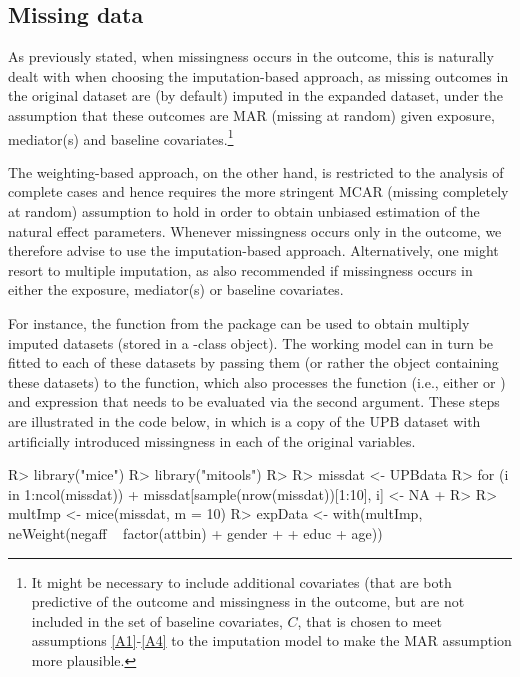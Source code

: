 \documentclass[nojss]{jss}
\begin{document}
\subsection{Missing data}
As previously stated, when missingness occurs in the outcome, this is naturally dealt with when choosing the imputation-based approach, as missing outcomes in the original dataset are (by default) imputed in the expanded dataset, under the assumption that these outcomes are MAR (missing at random) given exposure, mediator(s) and baseline covariates.\footnote{It might be necessary to include additional covariates (that are both predictive of the outcome and missingness in the outcome, but are not included in the set of baseline covariates, $C$, that is chosen to meet assumptions \ref{A1}-\ref{A4} to the imputation model to make the MAR assumption more plausible.} 
\par The weighting-based approach, on the other hand, is restricted to the analysis of complete cases and hence requires the more stringent MCAR (missing completely at random) assumption to hold in order to obtain unbiased estimation of the natural effect parameters. Whenever missingness occurs only in the outcome, we therefore advise to use the imputation-based approach. Alternatively, one might resort to multiple imputation, as also recommended if missingness occurs in either the exposure, mediator(s) or baseline covariates. 
\par For instance, the  function from the  package \citep{R:mice} can be used to obtain multiply imputed datasets (stored in a -class object). The working model can in turn be fitted to each of these datasets by passing them (or rather the object containing these datasets) to the  function, which also processes the function (i.e., either  or ) and expression that needs to be evaluated via the second argument. These steps are illustrated in the code below, in which  is a copy of the UPB dataset with artificially introduced missingness in each of the original variables.
\begin{Schunk}
\begin{Sinput}
R> library("mice")
R> library("mitools")
R> 
R> missdat <- UPBdata
R> for (i in 1:ncol(missdat)) {
+    missdat[sample(nrow(missdat))[1:10], i] <- NA
+  }
R> 
R> multImp <- mice(missdat, m = 10)
R> expData <- with(multImp, neWeight(negaff ~ factor(attbin) + gender 
+    + educ + age))
\end{Sinput}
\end{Schunk}
\end{document}
